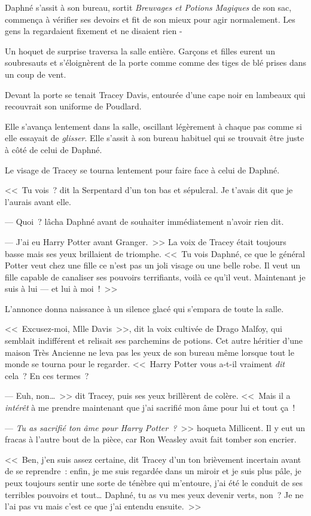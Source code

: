 Daphné s'assit à son bureau, sortit \emph{Breuvages et Potions Magiques} de son sac, commença à vérifier ses devoirs et fit de son mieux pour agir normalement. Les gens la regardaient fixement et ne disaient rien -

Un hoquet de surprise traversa la salle entière. Garçons et filles eurent un soubresauts et s'éloignèrent de la porte comme comme des tiges de blé prises dans un coup de vent.

Devant la porte se tenait Tracey Davis, entourée d'une cape noir en lambeaux qui recouvrait son uniforme de Poudlard.

Elle s'avança lentement dans la salle, oscillant légèrement à chaque pas comme si elle essayait de \emph{glisser}. Elle s'assit à son bureau habituel qui se trouvait être juste à côté de celui de Daphné.

Le visage de Tracey se tourna lentement pour faire face à celui de Daphné.

<<~Tu vois~? dit la Serpentard d'un ton bas et sépulcral. Je t'avais dit que je l'aurais avant elle.

--- Quoi~? lâcha Daphné avant de souhaiter immédiatement n'avoir rien dit.

--- J'ai eu Harry Potter avant Granger.~>> La voix de Tracey était toujours basse mais ses yeux brillaient de triomphe. <<~Tu vois Daphné, ce que le général Potter veut chez une fille ce n'est pas un joli visage ou une belle robe. Il veut un fille capable de canaliser ses pouvoirs terrifiants, voilà ce qu'il veut. Maintenant je suis à lui — et lui à moi~!~>>

L'annonce donna naissance à un silence glacé qui s'empara de toute la salle.

<<~Excusez-moi, Mlle Davis~>>, dit la voix cultivée de Drago Malfoy, qui semblait indifférent et relisait ses parchemins de potions. Cet autre héritier d'une maison Très Ancienne ne leva pas les yeux de son bureau même lorsque tout le monde se tourna pour le regarder. <<~Harry Potter vous a-t-il vraiment \emph{dit} cela~? En ces termes~?

--- Euh, non…~>> dit Tracey, puis ses yeux brillèrent de colère. <<~Mais il a \emph{intérêt} à me prendre maintenant que j'ai sacrifié mon âme pour lui et tout ça~!

--- \emph{Tu as sacrifié ton âme pour Harry Potter~?}~>> hoqueta Millicent. Il y eut un fracas à l'autre bout de la pièce, car Ron Weasley avait fait tomber son encrier.

<<~Ben, j'en suis assez certaine, dit Tracey d'un ton brièvement incertain avant de se reprendre~: enfin, je me suis regardée dans un miroir et je suis plus pâle, je peux toujours sentir une sorte de ténèbre qui m'entoure, j'ai été le conduit de ses terribles pouvoirs et tout… Daphné, tu as vu mes yeux devenir verts, non~? Je ne l'ai pas vu mais c'est ce que j'ai entendu ensuite.~>>

